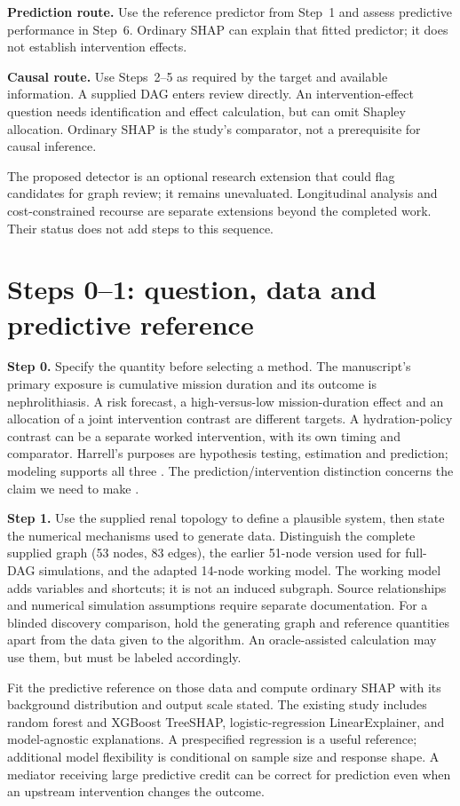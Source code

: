 \documentclass[11pt,letterpaper]{article}
\begin{document}
\textbf{Prediction route.} Use the reference predictor from Step~1 and assess predictive performance in Step~6. Ordinary SHAP can explain that fitted predictor; it does not establish intervention effects.

\textbf{Causal route.} Use Steps~2--5 as required by the target and available information. A supplied DAG enters review directly. An intervention-effect question needs identification and effect calculation, but can omit Shapley allocation. Ordinary SHAP is the study's comparator, not a prerequisite for causal inference.

The proposed detector is an optional research extension that could flag candidates for graph review; it remains unevaluated. Longitudinal analysis and cost-constrained recourse are separate extensions beyond the completed work. Their status does not add steps to this sequence.

\clearpage
\section*{Steps 0--1: question, data and predictive reference}

\textbf{Step 0.} Specify the quantity before selecting a method. The manuscript's primary exposure is cumulative mission duration and its outcome is nephrolithiasis. A risk forecast, a high-versus-low mission-duration effect and an allocation of a joint intervention contrast are different targets. A hydration-policy contrast can be a separate worked intervention, with its own timing and comparator. Harrell's purposes are hypothesis testing, estimation and prediction; modeling supports all three \citep{HarrellRMSIntroduction}. The prediction/intervention distinction concerns the claim we need to make \citep{HernanHsuHealy2019}.

\textbf{Step 1.} Use the supplied renal topology to define a plausible system, then state the numerical mechanisms used to generate data. Distinguish the complete supplied graph (53 nodes, 83 edges), the earlier 51-node version used for full-DAG simulations, and the adapted 14-node working model. The working model adds variables and shortcuts; it is not an induced subgraph. Source relationships and numerical simulation assumptions require separate documentation. For a blinded discovery comparison, hold the generating graph and reference quantities apart from the data given to the algorithm. An oracle-assisted calculation may use them, but must be labeled accordingly.

Fit the predictive reference on those data and compute ordinary SHAP with its background distribution and output scale stated. The existing study includes random forest and XGBoost TreeSHAP, logistic-regression LinearExplainer, and model-agnostic explanations. A prespecified regression is a useful reference; additional model flexibility is conditional on sample size and response shape. A mediator receiving large predictive credit can be correct for prediction even when an upstream intervention changes the outcome.
\end{document}
